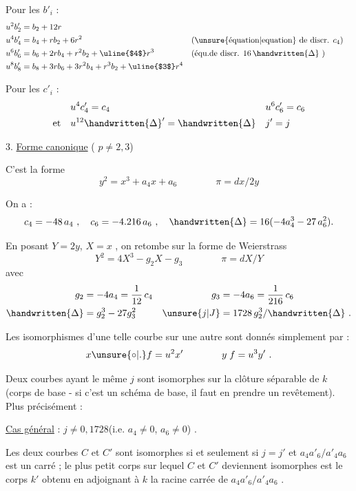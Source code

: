 Pour les $b'_{i}$ :
\[
\begin{aligned}
u^{2}b'_{2}&=b_{2}+12r\\
u^{4}b'_{4}&=b_{4}+rb_{2}+6r^{2} &&\text{(\unsure{équation|equation} de discr. }c_{4}\text{)}\\
u^{6}b'_{6}&=b_{6}+2rb_{4}+r^{2}b_{2}+\text{\uline{$4$}}r^{3}
    &&\text{(équ.de discr. }16\,\handwritten{\Delta}\text{ )}\\
u^{8}b'_{8}&=b_{8}+3rb_{6}+3r^{2}b_{4}+r^{3}b_{2}+\text{\uline{$3$}}r^{4}
\end{aligned}
\]

Pour les $c'_{i}$ :
\[
\begin{aligned}
 &u^{4}c'_{4}=c_{4}&&u^{6}c'_{6}=c_{6}\\
\text{et}\quad &u^{12}\handwritten{\Delta}'=\handwritten{\Delta}&&j'=j
\end{aligned}
\]


3. \uline{Forme canonique} ( $p\ne 2,3$)

C'est la forme
\[
 y^{2}=x^{3}+a_{4}x+a_{6}\qquad\qquad \pi=dx/2y
\]

On a :
\[
 c_{4}=-48\,a_{4}\ ,\quad c_{6}=-4\mathord{.}216\,a_{6}\ ,\quad
 \handwritten{\Delta}=16(-4a_{4}^{3}-27\,a_{6}^{2}).
\]

En posant $Y=2y$, $X=x$ , on retombe sur la forme de Weierstrass
\[
 Y^{2}=4X^{3}-g_{2}X-g_{3}\qquad\qquad \pi=dX/Y
\]
avec
\[
\begin{aligned}
g_{2}&=-4a_{4}=\frac{1}{12}\,c_{4} & g_{3}&=-4a_{6}=\frac{1}{216}\,c_{6}\\
\handwritten{\Delta}&=g_{2}^{3}-27g_{3}^{2} & \unsure{j|J}&=1728\,g_{2}^{3}/\handwritten{\Delta}\ .
\end{aligned}
\]

Les isomorphismes d'une telle courbe sur une autre sont donnés simplement par :
\[
 x\unsure{\circ|\mathord{.}}f=u^{2}x'\qquad\qquad y\;f=u^{3}y'\ .
\]

Deux courbes ayant le même $j$ sont isomorphes sur la clôture séparable de $k$ (corps de base - si c'est un schéma de base, il faut en prendre un revêtement). Plus précisément :

\uline{Cas général} : $j\ne 0,1728$\quad (i.e. $a_{4}\ne 0$, $a_{6}\ne 0$) .

Les deux courbes $C$ et $C'$ sont isomorphes si et seulement si $j=j'$ et $a_{4}a'_{6}/a'_{4}a_{6}$ est un carré ; le plus petit corps sur lequel $C$ et $C'$ deviennent isomorphes est le corps $k'$ obtenu en adjoignant à $k$ la racine carrée de $a_{4}a'_{6}/a'_{4}a_{6}$ .

